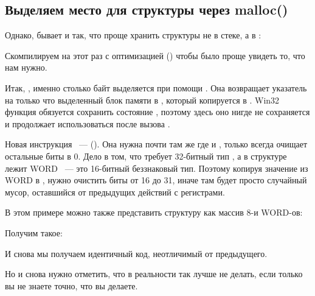 \subsection{Выделяем место для структуры через malloc()}
\label{struct_malloc_example}

Однако, бывает и так, что проще хранить структуры не в стеке, а в :




Скомпилируем на этот раз с оптимизацией (\Ox) чтобы было проще увидеть то, что нам нужно.




Итак, , именно столько байт выделяется при помощи . 
Она возвращает указатель на только что выделенный блок памяти в \EAX, который копируется в \ESI. 
Win32 функция  обязуется сохранить состояние \ESI, 
поэтому здесь оно нигде не сохраняется и продолжает использоваться после вызова .



Новая инструкция ~--- \MOVZX (). 
Она нужна почти там же где и \MOVSX, 
только всегда очищает остальные биты в 0. Дело в том, что \printf требует 32-битный тип \Tint, 
а в структуре лежит WORD ~--- это 16-битный беззнаковый тип. Поэтому копируя значение из WORD в \Tint, 
нужно очистить биты от 16 до 31, иначе там будет просто случайный мусор, оставшийся от предыдущих действий 
с регистрами.


В этом примере можно также представить структуру как массив 8-и WORD-ов:




Получим такое:



И снова мы получаем идентичный код, неотличимый от предыдущего.

Но и снова нужно отметить, что в реальности так лучше не делать, 
если только вы не знаете точно, что вы делаете.



